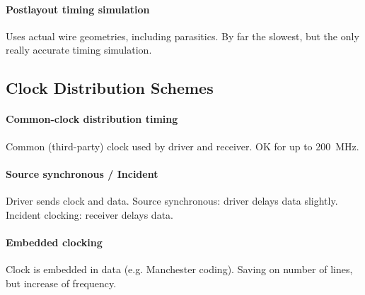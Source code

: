\paragraph{Postlayout timing simulation}
Uses actual wire geometries, including parasitics.
By far the slowest, but the only really accurate timing simulation.

\subsection{Clock Distribution Schemes}

\paragraph{Common-clock distribution timing}
Common (third-party) clock used by driver and receiver. OK for up to \SI{200}{\mega\hertz}. 

\paragraph{Source synchronous / Incident}
Driver sends clock and data. 
Source synchronous: driver delays data slightly. 
Incident clocking: receiver delays data.

\paragraph{Embedded clocking}
Clock is embedded in data (e.g. Manchester coding).
Saving on number of lines, but increase of frequency.